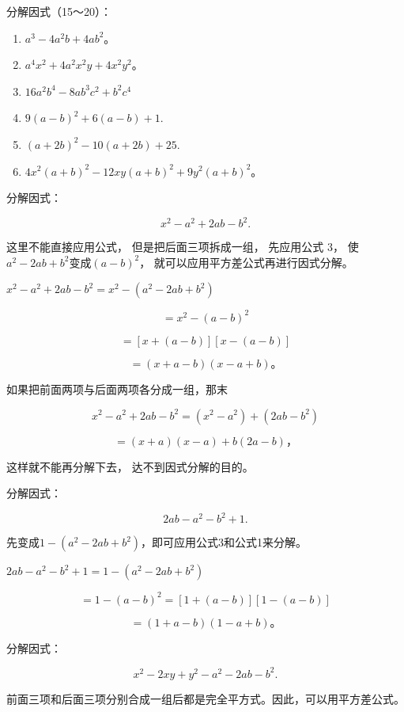 分解因式（15～20）：

\begin{enumerate}[start=15]
\item
  \(a^3 - 4a^2b + 4ab^2\)。
\item
  \(a^4 x^2 + 4a^2 x^2 y + 4x^2 y^2\)。
\item
  \(16a^{2}b^{4} - 8ab^{3}c^{2} + b^{2}c^{4}\)
\item
  \(9(a - b)^{2} + 6(a - b) + 1.\)
\item
  \((a + 2b)^{2} - 10(a + 2b) + 25.\)
\item
  \(4x^{2}(a + b)^{2} - 12xy(a + b)^{2} + 9y^{2}(a + b)^{2}\)。
\end{enumerate}

 分解因式：

\[
x ^{2} - a ^{2} + 2 a b - b ^{2}.
\]

 这里不能直接应用公式， 但是把后面三项拆成一组，
先应用公式 3， 使\(a^2 - 2ab + b^2\)变成\((a - b)^2\)，
就可以应用平方差公式再进行因式分解。

\(x^2 - a^2 + 2ab - b^2 = x^2 - (a^2 - 2ab + b^2)\)

\[
= x ^{2} - (a - b) ^{2}
\]

\[
= [ x + (a - b) ] [ x - (a - b) ]
\]

\[
= (x + a - b) (x - a + b)\text{。}
\]

 如果把前面两项与后面两项各分成一组，那末

\[
x ^{2} - a ^{2} + 2 a b - b ^{2} = (x ^{2} - a ^{2}) + (2 a b - b ^{2})
\]

\[
= (x + a) (x - a) + b (2 a - b)\text{，}
\]

这样就不能再分解下去， 达不到因式分解的目的。

 分解因式：

\[
2 a b - a ^{2} - b ^{2} + 1.
\]

先变成\(1 - (a^2 - 2ab + b^2)\)，即可应用公式3和公式1来分解。

\(2ab - a^2 - b^2 +1 = 1 - (a^2 -2ab + b^2)\)

\[
= 1 - (a - b) ^{2} = [ 1 + (a - b) ] [ 1 - (a - b) ]
\]

\[
= (1 + a - b) (1 - a + b)\text{。}
\]

 分解因式：

\[
x ^{2} - 2 x y + y ^{2} - a ^{2} - 2 a b - b ^{2}.
\]

前面三项和后面三项分别合成一组后都是完全平方式。因此，可以用平方差公式。

